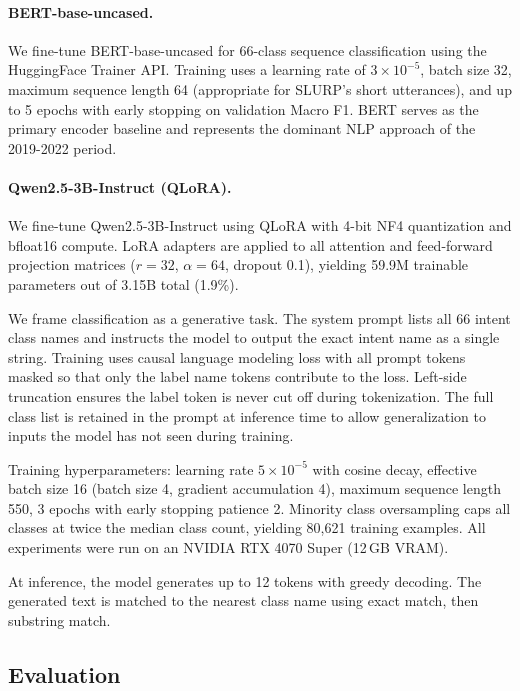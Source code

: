 \documentclass[11pt,a4paper]{article}
\begin{document}
\paragraph{BERT-base-uncased.}
We fine-tune BERT-base-uncased \citep{devlin2019bert} for 66-class sequence classification using the HuggingFace Trainer API. Training uses a learning rate of $3 \times 10^{-5}$, batch size 32, maximum sequence length 64 (appropriate for SLURP's short utterances), and up to 5 epochs with early stopping on validation Macro F1. BERT serves as the primary encoder baseline and represents the dominant NLP approach of the 2019-2022 period.

\paragraph{Qwen2.5-3B-Instruct (QLoRA).}
We fine-tune Qwen2.5-3B-Instruct \citep{qwen2024} using QLoRA \citep{dettmers2023qlora} with 4-bit NF4 quantization and bfloat16 compute. LoRA adapters are applied to all attention and feed-forward projection matrices ($r=32$, $\alpha=64$, dropout 0.1), yielding 59.9M trainable parameters out of 3.15B total (1.9\%).

We frame classification as a generative task. The system prompt lists all 66 intent class names and instructs the model to output the exact intent name as a single string. Training uses causal language modeling loss with all prompt tokens masked so that only the label name tokens contribute to the loss. Left-side truncation ensures the label token is never cut off during tokenization. The full class list is retained in the prompt at inference time to allow generalization to inputs the model has not seen during training.

Training hyperparameters: learning rate $5 \times 10^{-5}$ with cosine decay, effective batch size 16 (batch size 4, gradient accumulation 4), maximum sequence length 550, 3 epochs with early stopping patience 2. Minority class oversampling caps all classes at twice the median class count, yielding 80,621 training examples. All experiments were run on an NVIDIA RTX 4070 Super (12\,GB VRAM).

At inference, the model generates up to 12 tokens with greedy decoding. The generated text is matched to the nearest class name using exact match, then substring match.

\subsection{Evaluation}
\end{document}
